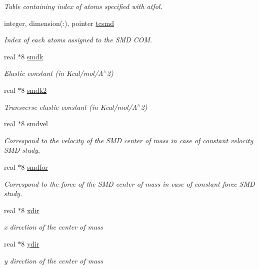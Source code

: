 \begin{DoxyCompactItemize}
\begin{DoxyCompactList}\small\item\em Table containing index of atoms specified with atfol. \end{DoxyCompactList}\item 
integer, dimension(\-:), pointer \hyperlink{classmsmd_aed5f2109d5aea9e984f03f12175bc47b}{tcsmd}
\begin{DoxyCompactList}\small\item\em Index of each atoms assigned to the S\-M\-D C\-O\-M. \end{DoxyCompactList}\item 
real $\ast$8 \hyperlink{classmsmd_a00a3fbfb67f2675eef2955590ca83a72}{smdk}
\begin{DoxyCompactList}\small\item\em Elastic constant (in Kcal/mol/\-A$^\wedge$2) \end{DoxyCompactList}\item 
real $\ast$8 \hyperlink{classmsmd_ac7b1d430b9652f2e07695a4ca5310b7f}{smdk2}
\begin{DoxyCompactList}\small\item\em Transverse elastic constant (in Kcal/mol/\-A$^\wedge$2) \end{DoxyCompactList}\item 
real $\ast$8 \hyperlink{classmsmd_a1c3a1848e4d98289076e603fab46105a}{smdvel}
\begin{DoxyCompactList}\small\item\em Correspond to the velocity of the S\-M\-D center of mass in case of constant velocity S\-M\-D study. \end{DoxyCompactList}\item 
real $\ast$8 \hyperlink{classmsmd_a0cfec7a2408289c6345e02f9be8ed9ef}{smdfor}
\begin{DoxyCompactList}\small\item\em Correspond to the force of the S\-M\-D center of mass in case of constant force S\-M\-D study. \end{DoxyCompactList}\item 
real $\ast$8 \hyperlink{classmsmd_adece962187d68486034a4eafca72632c}{xdir}
\begin{DoxyCompactList}\small\item\em x direction of the center of mass \end{DoxyCompactList}\item 
real $\ast$8 \hyperlink{classmsmd_a093de4aa2e9c0ee9bddec7c9d664f53f}{ydir}
\begin{DoxyCompactList}\small\item\em y direction of the center of mass \end{DoxyCompactList}\item 

\end{DoxyCompactItemize}
